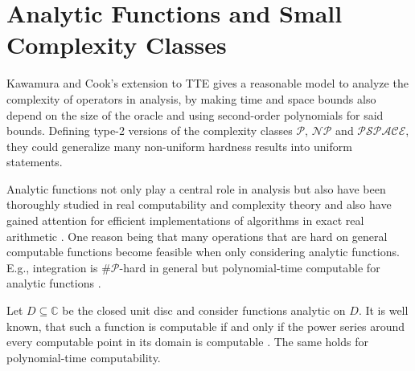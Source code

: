 \documentclass{article}
\newcommand{\CC}{\mathbb C}
\newcommand{\p}{\ensuremath{\mathcal P}\xspace}
\newcommand{\np}{\ensuremath{\mathcal{NP}}\xspace}
\newcommand{\sharpp}{\ensuremath{\# \mathcal{P}}\xspace}
\newcommand{\pspace}{\ensuremath{ \mathcal{PSPACE}}\xspace}
\begin{document}
\section*{Analytic Functions and Small Complexity Classes}
Kawamura and Cook's extension to TTE \cite{AkiACM} gives a reasonable model to  analyze the complexity of operators in analysis, by making time and space bounds also depend on the size of the oracle and using second-order polynomials for said bounds.
Defining type-2 versions of the complexity classes \p, \np and \pspace, they could generalize many non-uniform hardness results into uniform statements.

Analytic functions not only play a central role in analysis but also have been thoroughly studied in real computability and complexity theory and also have gained attention for efficient implementations of algorithms in exact real arithmetic \cite{DBLP:journals/corr/abs-1006-0401}.
One reason being that many operations that are hard on general computable functions become feasible when only considering analytic functions.
E.g., integration is \sharpp-hard in general \cite{MR748898,AkiACM} but polynomial-time computable for analytic functions \cite{MR1137517, Kawamura2012}.  

Let $D \subseteq \CC$ be the closed unit disc and consider functions analytic on $D$.
It is well known, that such a function is computable if and only if the power series around every computable point in its domain is computable \cite{MR1137517}.
The same holds for polynomial-time computability.
\end{document}
